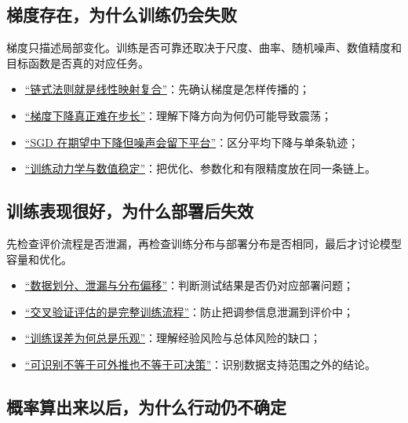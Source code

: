 \subsection{梯度存在，为什么训练仍会失败}

梯度只描述局部变化。训练是否可靠还取决于尺度、曲率、随机噪声、数值精度和目标函数是否真的对应任务。

\begin{itemize}
\tightlist
\item \hyperref[sec:10-Matrix-Calculus/02-Differentials/02]{``链式法则就是线性映射复合''}：先确认梯度是怎样传播的；
\item \hyperref[sec:09-Convex-Optimization/06-Optimization-Algorithms/01]{``梯度下降真正难在步长''}：理解下降方向为何仍可能导致震荡；
\item \hyperref[sec:09-Convex-Optimization/08-Nonconvex-and-Stochastic-Optimization/04]{``SGD 在期望中下降但噪声会留下平台''}：区分平均下降与单条轨迹；
\item \hyperref[sec:14-Deep-Learning/03-Optimization-and-Training/01]{``训练动力学与数值稳定''}：把优化、参数化和有限精度放在同一条链上。
\end{itemize}

\subsection{训练表现很好，为什么部署后失效}

先检查评价流程是否泄漏，再检查训练分布与部署分布是否相同，最后才讨论模型容量和优化。

\begin{itemize}
\tightlist
\item \hyperref[sec:13-Machine-Learning/01-Learning-Problems-and-Evaluation/04]{``数据划分、泄漏与分布偏移''}：判断测试结果是否仍对应部署问题；
\item \hyperref[sec:11-Mathematical-Statistics/06-Resampling-and-Model-Selection/03]{``交叉验证评估的是完整训练流程''}：防止把调参信息泄漏到评价中；
\item \hyperref[sec:13-Machine-Learning/10-Learning-Theory/01]{``训练误差为何总是乐观''}：理解经验风险与总体风险的缺口；
\item \hyperref[sec:13-Machine-Learning/12-Causal-Inference/06]{``可识别不等于可外推也不等于可决策''}：识别数据支持范围之外的结论。
\end{itemize}

\subsection{概率算出来以后，为什么行动仍不确定}

